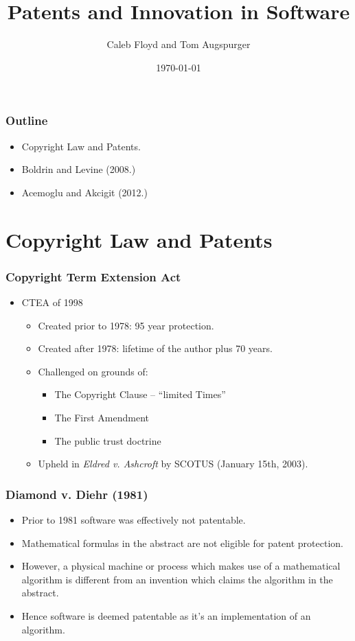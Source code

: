 \documentclass{beamer}
\title{Patents and Innovation in Software}
\author{Caleb Floyd and Tom Augspurger}
\date{\today}
\begin{document}
\frame{\titlepage}

\begin{frame}[t]\frametitle{Outline}
    
\begin{itemize}
  \item Copyright Law and Patents.
  \item Boldrin and Levine (2008.)
  \item Acemoglu and Akcigit (2012.)
\end{itemize}

\end{frame}

\section{Copyright Law and Patents}
\label{sec:copyright_law_and_patents}

\begin{frame}[t]
    \frametitle{Copyright Term Extension Act}
  \begin{itemize}
    \item<+-> CTEA of 1998
      \begin{itemize}
        \item<+-> Created prior to 1978: 95 year protection.
        \item<+-> Created after 1978: lifetime of the author plus 70 years.
        \item<+-> Challenged on grounds of:
        \begin{itemize}
            \item<+-> The Copyright Clause -- ``limited Times''
            \item<+-> The First Amendment
            \item<+-> The public trust doctrine
        \end{itemize}
        \item<+-> Upheld in \emph{Eldred v. Ashcroft} by SCOTUS (January 15th, 2003).
    \end{itemize}
  \end{itemize}
\end{frame}

\begin{frame}[t]
 \frametitle{Diamond v. Diehr (1981)}
 \begin{itemize}
     \item<+-> Prior to 1981 software was effectively not patentable.
     \item<+-> Mathematical formulas in the abstract are not eligible for patent protection.
     \item<+-> However, a physical machine or process which makes use of a mathematical algorithm is different from an invention which claims the algorithm in the abstract.
     \item<+-> Hence software is deemed patentable as it's an implementation of an algorithm.
 \end{itemize}
\end{frame}
\end{document}

